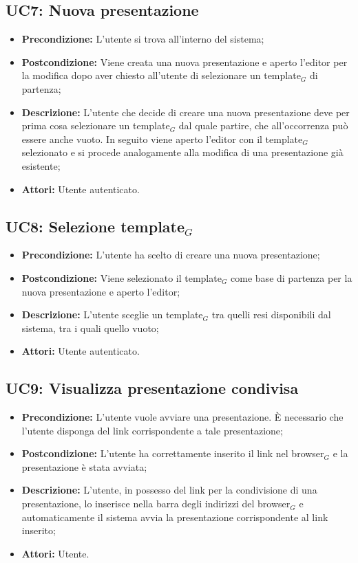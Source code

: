 \subsection{ UC7: Nuova presentazione}

\begin{itemize}
	\item \textbf{Precondizione:} L’utente si trova all’interno del sistema;
	\item \textbf{Postcondizione:} Viene creata una nuova presentazione e aperto l’editor per la modifica dopo aver chiesto all’utente di selezionare un template$_G$ di partenza;
	\item \textbf{Descrizione:} L’utente che decide di creare una nuova presentazione deve per prima cosa selezionare un template$_G$ dal quale partire, che all’occorrenza può essere anche vuoto. In seguito viene aperto l’editor con il template$_G$ selezionato e si procede analogamente alla modifica di una presentazione già esistente;
	\item \textbf{Attori:} Utente autenticato.
\end{itemize}
\subsection{ UC8: Selezione template$_G$}

\begin{itemize}
	\item \textbf{Precondizione:} L’utente ha scelto di creare una nuova presentazione;
	\item \textbf{Postcondizione:} Viene selezionato il template$_G$ come base di partenza per la nuova presentazione e aperto l’editor;
	\item \textbf{Descrizione:} L’utente sceglie un template$_G$ tra quelli resi disponibili dal sistema, tra i quali quello vuoto;
	\item \textbf{Attori:} Utente autenticato.
\end{itemize}
\subsection{ UC9: Visualizza presentazione condivisa}

\begin{itemize}
	\item \textbf{Precondizione:} L’utente vuole avviare una presentazione. È necessario che l’utente disponga del link corrispondente a tale presentazione;
	\item \textbf{Postcondizione:} L’utente ha correttamente inserito il link nel browser$_G$ e la presentazione è stata avviata;
	\item \textbf{Descrizione:} L’utente, in possesso del link per la condivisione di una presentazione, lo inserisce nella barra degli indirizzi del browser$_G$ e automaticamente il sistema avvia la presentazione corrispondente al link inserito;
	\item \textbf{Attori:} Utente.
\end{itemize}